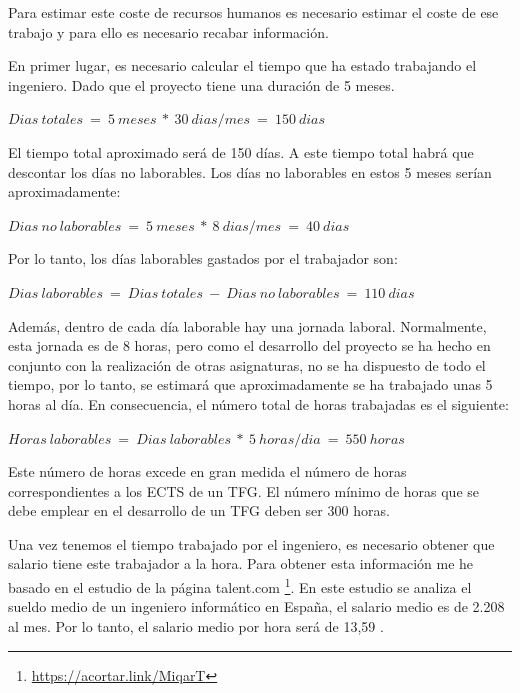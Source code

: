 Para estimar este coste de recursos humanos es necesario estimar el coste de ese trabajo y para ello es necesario recabar información.

En primer lugar, es necesario calcular el tiempo que ha estado trabajando el ingeniero. Dado que el proyecto tiene una duración de 5 meses.

\begin{center}
$Dias\ totales\ =\ 5\ meses\ *\ 30\ dias / mes\ =\ 150\ dias$
\end{center}

El tiempo total aproximado será de 150 días. A este tiempo total habrá que descontar los días no laborables. Los días no laborables en estos 5 meses serían aproximadamente:

\begin{center}
$Dias\ no\ laborables\ =\ 5\ meses\ *\ 8\ dias/mes\ =\ 40\ dias$
\end{center}

Por lo tanto, los días laborables gastados por el trabajador son:

\begin{center}
$Dias\ laborables\ =\ Dias\ totales\ -\ Dias\ no\ laborables\ =\ 110\ dias$
\end{center}

Además, dentro de cada día laborable hay una jornada laboral. Normalmente, esta jornada es de 8 horas, pero como el desarrollo del proyecto se ha hecho en conjunto con la realización de otras asignaturas, no se ha dispuesto de todo el tiempo, por lo tanto, se estimará que aproximadamente se ha trabajado unas 5 horas al día. En consecuencia, el número total de horas trabajadas es el siguiente:

\begin{center}
$Horas\ laborables\ =\ Dias\ laborables\ *\ 5\ horas/dia\ =\ 550\ horas$
\end{center}

Este número de horas excede en gran medida el número de horas correspondientes a los \gls{ECTS} de un TFG. El número mínimo de horas que se debe emplear en el desarrollo de un TFG deben ser 300 horas.

Una vez tenemos el tiempo trabajado por el ingeniero, es necesario obtener que salario tiene este trabajador a la hora. Para obtener esta información me he basado en el estudio de la página talent.com \footnote{\url{https://acortar.link/MiqarT}}. En este estudio se analiza el sueldo medio de un ingeniero informático en España, el salario medio es de 2.208 \EURtm al mes. Por lo tanto, el salario medio por hora será de 13,59 \EURtm.


